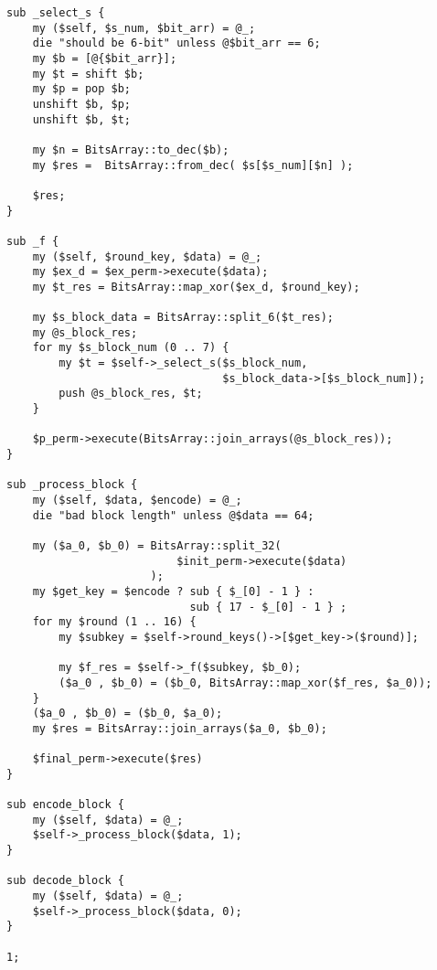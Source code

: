 \documentclass[10pt,a4paper]{article}
\begin{document}
\begin{lstlisting}
sub _select_s {
    my ($self, $s_num, $bit_arr) = @_;
    die "should be 6-bit" unless @$bit_arr == 6;
    my $b = [@{$bit_arr}];
    my $t = shift $b;
    my $p = pop $b;
    unshift $b, $p;
    unshift $b, $t;

    my $n = BitsArray::to_dec($b);
    my $res =  BitsArray::from_dec( $s[$s_num][$n] );

    $res;
}

sub _f {
    my ($self, $round_key, $data) = @_;
    my $ex_d = $ex_perm->execute($data);
    my $t_res = BitsArray::map_xor($ex_d, $round_key);

    my $s_block_data = BitsArray::split_6($t_res);
    my @s_block_res;
    for my $s_block_num (0 .. 7) {
        my $t = $self->_select_s($s_block_num,
                                 $s_block_data->[$s_block_num]);
        push @s_block_res, $t;
    }

    $p_perm->execute(BitsArray::join_arrays(@s_block_res));
}

sub _process_block {
    my ($self, $data, $encode) = @_;
    die "bad block length" unless @$data == 64;

    my ($a_0, $b_0) = BitsArray::split_32(
                          $init_perm->execute($data)
                      );
    my $get_key = $encode ? sub { $_[0] - 1 } :
                            sub { 17 - $_[0] - 1 } ;
    for my $round (1 .. 16) {
        my $subkey = $self->round_keys()->[$get_key->($round)];

        my $f_res = $self->_f($subkey, $b_0);
        ($a_0 , $b_0) = ($b_0, BitsArray::map_xor($f_res, $a_0));
    }
    ($a_0 , $b_0) = ($b_0, $a_0);
    my $res = BitsArray::join_arrays($a_0, $b_0);

    $final_perm->execute($res)
}

sub encode_block {
    my ($self, $data) = @_;
    $self->_process_block($data, 1);
}

sub decode_block {
    my ($self, $data) = @_;
    $self->_process_block($data, 0);
}

1;

\end{lstlisting}
\end{document}
